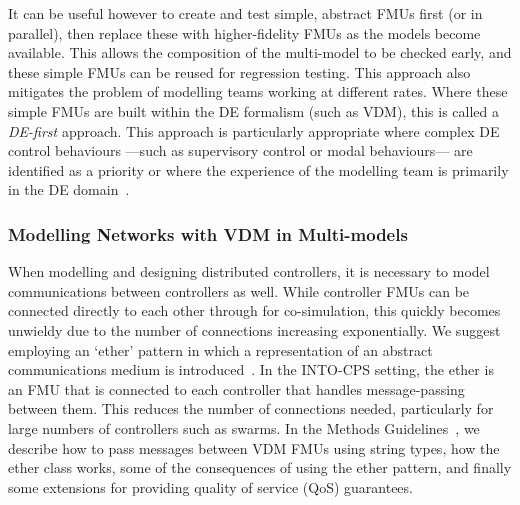 It can be useful however to create and test simple, abstract FMUs first (or in parallel), then replace these with higher-fidelity FMUs as the models become available. This allows the composition of the multi-model to be checked early, and these simple FMUs can be reused for regression testing. This approach also mitigates the problem of modelling teams working at different rates. Where these simple FMUs are built within the DE formalism (such as VDM), this is called a \emph{DE-first} approach. This approach is particularly appropriate where complex DE control behaviours ---such as supervisory control or modal behaviours--- are identified as a priority or where the experience of the modelling team is primarily in the DE domain~\cite{Fitzgerald&14c}.


\subsubsection{Modelling Networks with VDM in Multi-models}
\label{sec:method:networks}
When modelling and designing distributed controllers, it is necessary to model communications between controllers as well. While controller FMUs can be connected directly to each other through for co-simulation, this quickly becomes unwieldy due to the number of connections increasing exponentially. We suggest employing an `ether' pattern in which a representation of an abstract communications medium is introduced~\cite{Fitzgerald&14c}. In the INTO-CPS setting, the ether is an FMU that is connected to each controller that handles message-passing between them. This reduces the number of connections needed, particularly for large numbers of controllers such as swarms. In the Methods Guidelines~\cite{Pierce&18}, we describe how to pass messages between VDM FMUs using string types, how the ether class works, some of the consequences of using the ether pattern, and finally some extensions for providing quality of service (QoS) guarantees.


